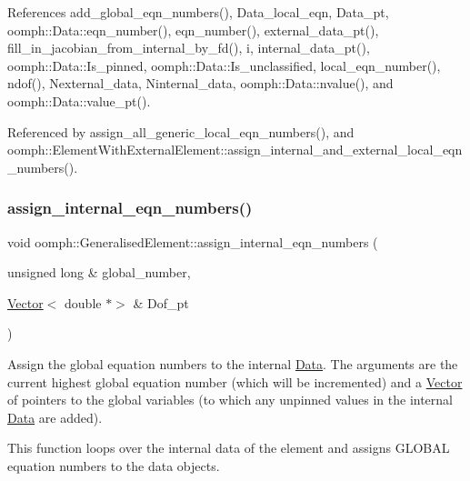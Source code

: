 References add\+\_\+global\+\_\+eqn\+\_\+numbers(), Data\+\_\+local\+\_\+eqn, Data\+\_\+pt, oomph\+::\+Data\+::eqn\+\_\+number(), eqn\+\_\+number(), external\+\_\+data\+\_\+pt(), fill\+\_\+in\+\_\+jacobian\+\_\+from\+\_\+internal\+\_\+by\+\_\+fd(), i, internal\+\_\+data\+\_\+pt(), oomph\+::\+Data\+::\+Is\+\_\+pinned, oomph\+::\+Data\+::\+Is\+\_\+unclassified, local\+\_\+eqn\+\_\+number(), ndof(), Nexternal\+\_\+data, Ninternal\+\_\+data, oomph\+::\+Data\+::nvalue(), and oomph\+::\+Data\+::value\+\_\+pt().



Referenced by assign\+\_\+all\+\_\+generic\+\_\+local\+\_\+eqn\+\_\+numbers(), and oomph\+::\+Element\+With\+External\+Element\+::assign\+\_\+internal\+\_\+and\+\_\+external\+\_\+local\+\_\+eqn\+\_\+numbers().

\mbox{\label{classoomph_1_1GeneralisedElement_aab4797832b06c6ef7986582faa52ece6}} 
\subsubsection{\texorpdfstring{assign\+\_\+internal\+\_\+eqn\+\_\+numbers()}{assign\_internal\_eqn\_numbers()}}
{\footnotesize\ttfamily void oomph\+::\+Generalised\+Element\+::assign\+\_\+internal\+\_\+eqn\+\_\+numbers (\begin{DoxyParamCaption}\item[{unsigned long \&}]{global\+\_\+number,  }\item[{\hyperlink{classoomph_1_1Vector}{Vector}$<$ double $\ast$$>$ \&}]{Dof\+\_\+pt }\end{DoxyParamCaption})}



Assign the global equation numbers to the internal \hyperlink{classoomph_1_1Data}{Data}. The arguments are the current highest global equation number (which will be incremented) and a \hyperlink{classoomph_1_1Vector}{Vector} of pointers to the global variables (to which any unpinned values in the internal \hyperlink{classoomph_1_1Data}{Data} are added). 

This function loops over the internal data of the element and assigns G\+L\+O\+B\+AL equation numbers to the data objects.

